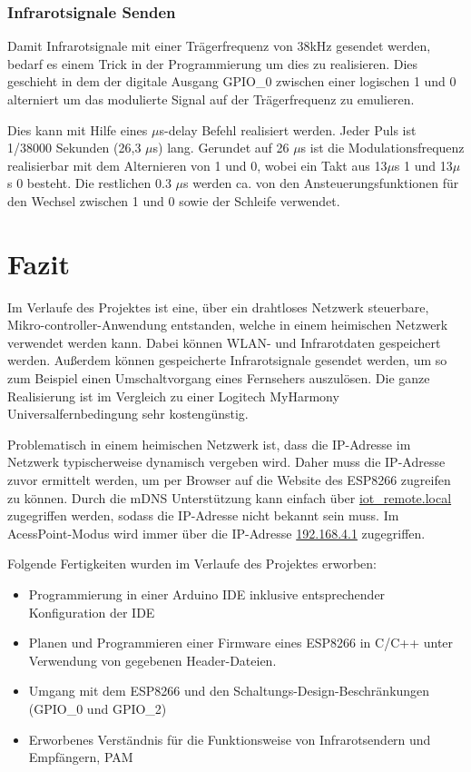 \subsubsection{Infrarotsignale Senden}
Damit Infrarotsignale mit einer Trägerfrequenz von 38kHz gesendet werden, bedarf es einem Trick in der Programmierung um dies zu realisieren.
Dies geschieht in dem der digitale Ausgang \acs{GPIO}\_0 zwischen einer logischen 1 und 0 alterniert um das modulierte Signal auf der Trägerfrequenz zu emulieren.

Dies kann mit Hilfe eines $\mu$s-delay Befehl realisiert werden.
Jeder Puls ist 1/38000 Sekunden (26,3 $\mu$s) lang. 
Gerundet auf 26 $\mu$s ist die Modulationsfrequenz realisierbar mit dem Alternieren von 1 und 0, wobei ein Takt aus 13$\mu$s 1 und 13$\mu$s 0 besteht.
Die restlichen 0.3 $\mu$s werden ca. von den Ansteuerungsfunktionen für den Wechsel zwischen 1 und 0 sowie der Schleife verwendet.

\section{Fazit}

Im Verlaufe des Projektes ist eine, über ein drahtloses Netzwerk steuerbare, Mikro-controller-Anwendung entstanden, welche in einem heimischen Netzwerk verwendet werden kann.
Dabei können WLAN- und Infrarotdaten gespeichert werden.
Außerdem können gespeicherte Infrarotsignale gesendet werden, um so zum Beispiel einen Umschaltvorgang eines Fernsehers auszulösen.
Die ganze Realisierung ist im Vergleich zu einer Logitech MyHarmony Universalfernbedingung sehr kostengünstig.

Problematisch in einem heimischen Netzwerk ist, dass die IP-Adresse im Netzwerk typischerweise dynamisch vergeben wird.
Daher muss die IP-Adresse zuvor ermittelt werden, um per Browser auf die Website des ESP8266 zugreifen zu können.
Durch die mDNS Unterstützung kann einfach über \url{iot_remote.local} zugegriffen werden, sodass die IP-Adresse nicht bekannt sein muss.
Im AcessPoint-Modus wird immer über die IP-Adresse \url{192.168.4.1} zugegriffen.

Folgende Fertigkeiten wurden im Verlaufe des Projektes erworben:
\begin{itemize}
	\item Programmierung in einer Arduino \acs{IDE} inklusive entsprechender Konfiguration der \acs{IDE}
	\item Planen und Programmieren einer Firmware eines ESP8266 in C/C++ unter Verwendung von gegebenen Header-Dateien.
	\item Umgang mit dem ESP8266 und den Schaltungs-Design-Beschränkungen (GPIO\_0 und GPIO\_2)
	\item Erworbenes Verständnis für die Funktionsweise von Infrarotsendern und Empfängern, \acs{PAM}
\end{itemize} 

